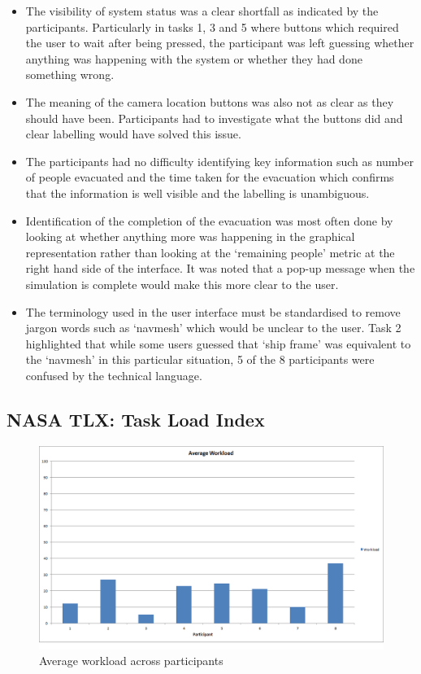 \begin{itemize}
\item The visibility of system status was a clear shortfall as indicated by the participants. Particularly in tasks 1, 3 and 5 where buttons which required the user to wait after being pressed, the participant was left guessing whether anything was happening with the system or whether they had done something wrong.
\item The meaning of the camera location buttons was also not as clear as they should have been. Participants had to investigate what the buttons did and clear labelling would have solved this issue.
\item The participants had no difficulty identifying key information such as number of people evacuated and the time taken for the evacuation which confirms that the information is well visible and the labelling is unambiguous.
\item Identification of the completion of the evacuation was most often done by looking at whether anything more was happening in the graphical representation rather than looking at the `remaining people' metric at the right hand side of the interface. It was noted that a pop-up message when the simulation is complete would make this more clear to the user.
\item The terminology used in the user interface must be standardised to remove jargon words such as ‘navmesh’ which would be unclear to the user. Task 2 highlighted that while some users guessed that ‘ship frame’ was equivalent to the ‘navmesh’ in this particular situation, 5 of the 8 participants were confused by the technical language. 
\end{itemize}

\subsection{NASA TLX: Task Load Index}

\begin{figure}[H]
	\centering
	\includegraphics[scale=0.25]{../images/tlxresults.png}
	\caption{Average workload across participants}
\end{figure}

